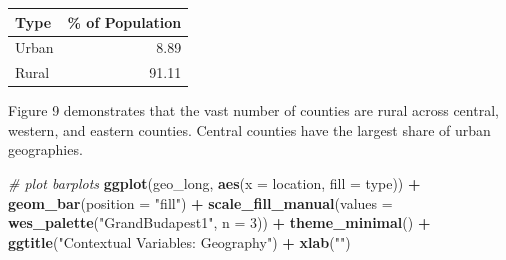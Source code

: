 \documentclass[]{article}
\newenvironment{Shaded}{\begin{snugshade}}{\end{snugshade}}
\newcommand{\CommentTok}[1]{\textcolor[rgb]{0.56,0.35,0.01}{\textit{#1}}}
\newcommand{\DataTypeTok}[1]{\textcolor[rgb]{0.13,0.29,0.53}{#1}}
\newcommand{\DecValTok}[1]{\textcolor[rgb]{0.00,0.00,0.81}{#1}}
\newcommand{\KeywordTok}[1]{\textcolor[rgb]{0.13,0.29,0.53}{\textbf{#1}}}
\newcommand{\NormalTok}[1]{#1}
\newcommand{\OperatorTok}[1]{\textcolor[rgb]{0.81,0.36,0.00}{\textbf{#1}}}
\newcommand{\OtherTok}[1]{\textcolor[rgb]{0.56,0.35,0.01}{#1}}
\newcommand{\StringTok}[1]{\textcolor[rgb]{0.31,0.60,0.02}{#1}}
\begin{document}
\begin{longtable}[]{@{}lr@{}}
\toprule
Type & \% of Population\tabularnewline
\midrule
\endhead
Urban & 8.89\tabularnewline
Rural & 91.11\tabularnewline
\bottomrule
\end{longtable}

Figure 9 demonstrates that the vast number of counties are rural across
central, western, and eastern counties. Central counties have the
largest share of urban geographies.

\begin{Shaded}
\end{Shaded}

\begin{Shaded}
\begin{Highlighting}[]
\CommentTok{# plot barplots}
\KeywordTok{ggplot}\NormalTok{(geo_long, }\KeywordTok{aes}\NormalTok{(}\DataTypeTok{x =}\NormalTok{ location, }\DataTypeTok{fill =}\NormalTok{ type)) }\OperatorTok{+}
\StringTok{  }\KeywordTok{geom_bar}\NormalTok{(}\DataTypeTok{position =} \StringTok{"fill"}\NormalTok{) }\OperatorTok{+}
\StringTok{  }\KeywordTok{scale_fill_manual}\NormalTok{(}\DataTypeTok{values =} \KeywordTok{wes_palette}\NormalTok{(}\StringTok{"GrandBudapest1"}\NormalTok{, }\DataTypeTok{n =} \DecValTok{3}\NormalTok{)) }\OperatorTok{+}\StringTok{ }
\StringTok{  }\KeywordTok{theme_minimal}\NormalTok{() }\OperatorTok{+}
\StringTok{  }\KeywordTok{ggtitle}\NormalTok{(}\StringTok{"Contextual Variables: Geography"}\NormalTok{) }\OperatorTok{+}
\StringTok{  }\KeywordTok{xlab}\NormalTok{(}\StringTok{""}\NormalTok{)}
\end{Highlighting}
\end{Shaded}
\end{document}
